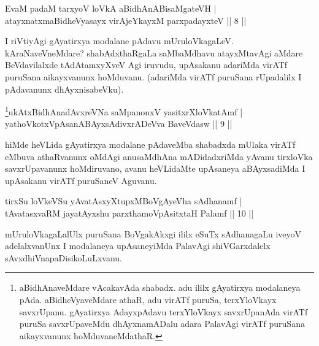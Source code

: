 \begin{shl}
EvaM padaM tarxyoV loVkA aBidhAnABisaMgateVH | \\
atayxnatxmaBidheVyasayx virAjeYkayxM parxpadayxteV \hfill ||  8 || 
\end{shl}

\begin{artha} 
I riVtiyAgi gAyatirxya modalane pAdavu mUruloVkagaLeV. 
kAraNaveVneMdare? shabAdxthaRgaLa saMbaMdhavu atayxMtavAgi aMdare 
BeVdavilalxde tAdAtamxyXveV Agi iruvudu, upAsakanu adariMda virATf 
puruSana aikayxvanunx hoMduvanu. (adariMda virATf puruSana rUpadalilx 
I pAdavanunx dhAyxnisabeVku).
\end{artha}


\begin{shl}
\footnote{aBidhAnaveMdare vAcakavAda shabadx. adu ililx gAyatirxya 
modalaneya pAda. aBidheVyaveMdare athaR, adu virATf puruSa, 
terxYloVkayx savxrUpanu. gAyatirxya AdayxpAdavu terxYloVkayx 
savxrUpanAda virATf puruSa savxrUpaveMdu dhAyxnamADalu adara PalavAgi 
virATf puruSana aikayxvanunx hoMduvaneMdathaR.}ukAtxBidhAnadAvxreVNa saMpanonxV yasitxrXloVkatAmf | \\
yathoVkotxVpAsanABAyxsAdivxrADeVva BaveVdasw \hfill ||  9 || 
\end{shl}

\begin{artha} 
hiMde heVLida gAyatirxya modalane pAdaveMba shabadxda mUlaka virATf 
eMbuva athaRvanunx oMdAgi anusaMdhAna mADidadxriMda yAvanu tirxloVka 
savxrUpavanunx hoMdiruvano, avanu heVLidaMte upAsaneya aBAyxsadiMda I 
upAsakanu virATf puruSaneV Aguvanu.
\end{artha}


\begin{shl}
tirxSu loVkeVSu yAvatAsxyXtupxMBoVgAyeVha sAdhanamf  | \\
tAvatasxvaRM jayatAyxshu parxthamoVpAsitxtaH Palamf \hfill ||  10 ||
\end{shl}

\begin{artha} 
mUruloVkagaLalUlx puruSana BoVgakAkxgi ililx eSuTx sAdhanagaLu iveyoV 
adelalxvanUnx I modalaneya upAsaneyiMda PalavAgi shiVGarxdalelx 
sAvxdhiVnapaDisikoLuLxvanu.
\end{artha}

